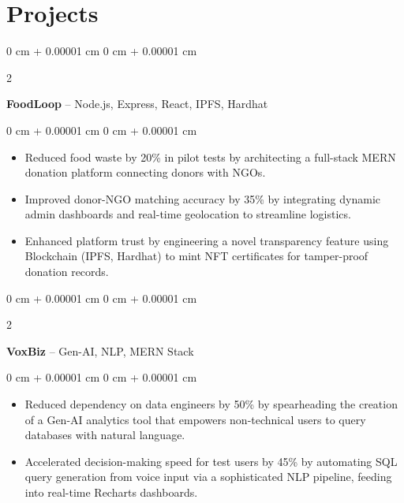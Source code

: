 \documentclass[10pt, letterpaper]{article}
\newenvironment{highlights}{
    \begin{itemize}[
        topsep=0.10 cm,
        parsep=0.10 cm,
        partopsep=0pt,
        itemsep=0pt,
        leftmargin=0 cm + 10pt
    ]
}{
    \end{itemize}
} %
\newenvironment{onecolentry}{
    \begin{adjustwidth}{
        0 cm + 0.00001 cm
    }{
        0 cm + 0.00001 cm
    }
}{
    \end{adjustwidth}
} %
\newenvironment{twocolentry}[2][]{
    \onecolentry
    \def\secondColumn{#2}
    \setcolumnwidth{\fill, 4.5 cm}
    \begin{paracol}{2}
}{
    \switchcolumn \raggedleft \secondColumn
    \end{paracol}
    \endonecolentry
} %
\begin{document}
    \section{Projects}

        \begin{twocolentry}{
            \href{https://github.com/ritheshan/FoodLoop}{\faGithub}
        }
            \textbf{FoodLoop} -- Node.js, Express, React, IPFS, Hardhat\end{twocolentry}

        \vspace{0.10 cm}
        \begin{onecolentry}
            \begin{highlights}
                \item Reduced food waste by 20\% in pilot tests by architecting a full-stack MERN donation platform connecting donors with NGOs.
                \item Improved donor-NGO matching accuracy by 35\% by integrating dynamic admin dashboards and real-time geolocation to streamline logistics.
                \item Enhanced platform trust by engineering a novel transparency feature using Blockchain (IPFS, Hardhat) to mint NFT certificates for tamper-proof donation records.
            \end{highlights}
        \end{onecolentry}

        \vspace{0.2 cm}

        \begin{twocolentry}{
            \href{https://github.com/ritheshan/VoxBiz}{\faGithub}
        }
            \textbf{VoxBiz} -- Gen-AI, NLP, MERN Stack\end{twocolentry}

        \vspace{0.10 cm}
        \begin{onecolentry}
            \begin{highlights}
                \item Reduced dependency on data engineers by 50\% by spearheading the creation of a Gen-AI analytics tool that empowers non-technical users to query databases with natural language.
                \item Accelerated decision-making speed for test users by 45\% by automating SQL query generation from voice input via a sophisticated NLP pipeline, feeding into real-time Recharts dashboards.
            \end{highlights}
        \end{onecolentry}
\end{document}
